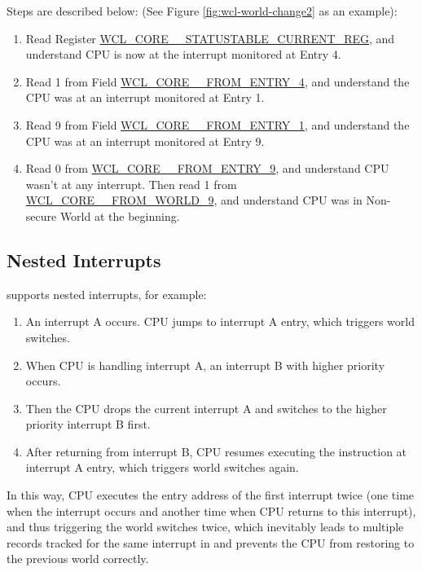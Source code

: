 \documentclass[main\_\_EN.tex]{subfiles}
\begin{document}
Steps are described below: (See Figure \ref{fig:wcl-world-change2} as an example):
\begin{enumerate}
    \item Read Register \hyperref[regdesc:WCLCORE0STATUSTABLECURRENTREG]{WCL\_CORE\_\_STATUSTABLE\_CURRENT\_REG}, and understand CPU is now at the interrupt monitored at Entry 4.
    \item  Read 1 from Field \hyperref[fielddesc:WCLCORE0FROMENTRYn]{WCL\_CORE\_\_FROM\_ENTRY\_4}, and understand the CPU was at an interrupt monitored at Entry 1.
    \item Read 9 from Field \hyperref[fielddesc:WCLCORE0FROMENTRYn]{WCL\_CORE\_\_FROM\_ENTRY\_1}, and understand the CPU was at an interrupt monitored at Entry 9.
    \item Read 0 from \hyperref[fielddesc:WCLCORE0FROMENTRYn]{WCL\_CORE\_\_FROM\_ENTRY\_9}, and understand CPU wasn't at any interrupt. Then read 1 from \hyperref[fielddesc:WCLCORE0FROMWORLDn]{WCL\_CORE\_\_FROM\_WORLD\_9}, and understand CPU was in Non-secure World at the beginning.
\end{enumerate}


\subsection{Nested Interrupts}

\chipname{} supports nested interrupts, for example:

\begin{enumerate}
    \item An interrupt A occurs. CPU jumps to interrupt A entry, which triggers world switches.
    \item When CPU is handling interrupt A, an  interrupt B with higher priority occurs.
    \item Then the CPU drops the current interrupt A and switches to the higher priority interrupt B first.
    \item After returning from interrupt B, CPU resumes executing the instruction at interrupt A entry, which triggers world switches again.
\end{enumerate}

In this way, CPU executes the entry address of the first interrupt twice (one time when the interrupt occurs and another time when CPU returns to this interrupt), and thus triggering the world switches twice, which inevitably leads to multiple records tracked for the same interrupt in  and prevents the CPU from restoring to the previous world correctly.
\end{document}
